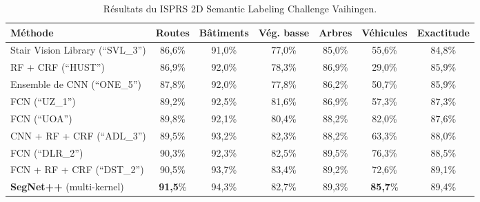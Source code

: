 \begin{table}[t]
  \centering
  \caption{Résultats du \gls{ISPRS} 2D Semantic Labeling Challenge Vaihingen.}
  \begin{tabularx}{\textwidth}{ Y c c c c c c }
  \toprule
  Méthode & Routes & Bâtiments & Vég. basse & Arbres & Véhicules & Exactitude\\
  \midrule
  Stair Vision Library {\scriptsize (``SVL\_3'')}\cite{gerke_use_2015} & 86,6\% &	91,0\% &	77,0\% &	85,0\%	& 55,6\% &	84,8\% \\
  RF + CRF {\scriptsize (``HUST'')}\cite{quang_efficient_2015} & 86,9\% & 92,0\% &	78,3\% &	86,9\% &	29,0\% &	85,9\% \\
  Ensemble de CNN {\scriptsize (``ONE\_5'')}\cite{boulch_dag_2015} & 87,8\% &	92,0\% &	77,8\% &	86,2\% &	50,7\% &	85,9\% \\
  FCN {\scriptsize (``UZ\_1'')}\cite{volpi_dense_2017} & 89,2\% &	92,5\% &	81,6\% &	86,9\% &	57,3\% &	87,3\% \\
  FCN {\scriptsize (``UOA'')}\cite{lin_efficient_2015} & 89,8\% &	92,1\% &	80,4\% &	88,2\% &	82,0\% &	87,6\% \\
  CNN + RF + CRF {\scriptsize (``ADL\_3'')}\cite{paisitkriangkrai_effective_2015} & 89,5\% &	93,2\% &	82,3\% &	88,2\% &	63,3\% &	88,0\% \\
  FCN {\scriptsize (``DLR\_2'')}\cite{marmanis_semantic_2016} & 90,3\% &	92,3\% &	82,5\% &	89,5\% &	76,3\% &	88,5\% \\
  FCN + RF + CRF {\scriptsize (``DST\_2'')}\cite{sherrah_fully_2016} & 90,5\% &	93,7\% &	83,4\% &	89,2\% &	72,6\% &	89,1\% \\
  \midrule
  \textbf{SegNet++} (multi-kernel)\cite{audebert_semantic_2016} & \textbf{91,5}\% &	94,3\% &	82,7\% &	89,3\% &	\textbf{85,7}\% &	89,4\% \\
  \bottomrule
  \end{tabularx}
  \label{tab:final_vaihingen}
\end{table}

